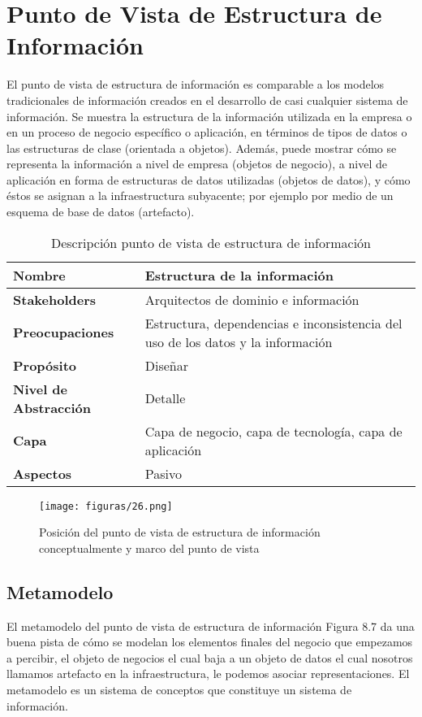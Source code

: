 \section{Punto de Vista de Estructura de Información}
El punto de vista de estructura de información es comparable a los modelos tradicionales de información creados en el desarrollo de casi cualquier sistema de información. Se muestra la estructura de la información utilizada en la empresa o en un proceso de negocio específico o aplicación, en términos de tipos de datos o las estructuras de clase (orientada a objetos). Además, puede mostrar cómo se representa la información a nivel
de empresa (objetos de negocio), a nivel de aplicación en forma de estructuras de datos utilizadas (objetos de datos), y cómo éstos se asignan a la infraestructura subyacente; por ejemplo por medio de un esquema de base de datos (artefacto).
    
    \begin{table}[!h]
    	\centering
    	\begin{tabular}{lp{8cm}}
    		\toprule
    		\textbf{Nombre} & \textbf{Estructura de la información} \\
    		\midrule
    		\textbf{Stakeholders} & Arquitectos de dominio e información \\
    		\textbf{Preocupaciones} & Estructura, dependencias e inconsistencia del uso de los datos y la información  \\
    		\textbf{Propósito} & Diseñar \\
    		\textbf{Nivel de Abstracción} & Detalle \\
    		\textbf{Capa} & Capa de negocio, capa de tecnología, capa de aplicación \\
    		\textbf{Aspectos} & Pasivo \\
    		\bottomrule
    	\end{tabular}
    	\captionsetup{width=.95\textwidth}
    	\caption{Descripción punto de vista de estructura de información}
    	\label{tabla17}
    \end{table}
    
    \begin{figure}[!h]
    	\centering
    	\texttt{[image: figuras/26.png]}
    	\captionsetup{width=.95\textwidth}
    	\caption{Posición del punto de vista de estructura de información conceptualmente y marco del punto de vista}
    	\label{figura26}
    \end{figure}
    
    \subsection{Metamodelo}
    El metamodelo del punto de vista de estructura de información Figura 8.7 da una buena pista de cómo se modelan los elementos finales del negocio que empezamos a percibir, el objeto de negocios el cual baja a un objeto de datos el cual nosotros llamamos artefacto en la infraestructura, le podemos asociar representaciones. El metamodelo es un sistema de conceptos que constituye un sistema de información.
    
